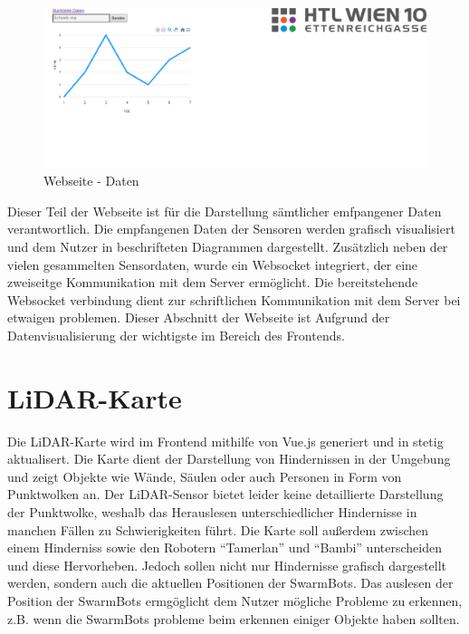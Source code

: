 \begin{figure}[H]
  \includegraphics[width=\textwidth, center]{img/Webseite_Daten.png}
  \caption{Webseite - Daten}
  \label{fig:Webseite_Daten}
\end{figure}

Dieser Teil der Webseite ist für die Darstellung sämtlicher emfpangener Daten verantwortlich.
Die empfangenen Daten der Sensoren werden grafisch visualisiert und dem Nutzer in beschrifteten Diagrammen dargestellt. 
%
Zusätzlich neben der vielen gesammelten Sensordaten, wurde ein Websocket integriert, 
der eine zweiseitge Kommunikation mit dem Server ermöglicht. 
%
Die bereitstehende Websocket verbindung dient zur schriftlichen Kommunikation mit dem Server bei etwaigen problemen.
%
Dieser Abschnitt der Webseite ist Aufgrund der Datenvisualisierung der wichtigste im Bereich des Frontends.

\section{LiDAR-Karte}
\label{subsec:frontend_lidar_map}
Die LiDAR-Karte wird im Frontend mithilfe von Vue.js generiert und in stetig aktualisert. 
Die Karte dient der Darstellung von Hindernissen in der Umgebung und zeigt Objekte wie Wände, 
Säulen oder auch Personen in Form von Punktwolken an. 
%
Der LiDAR-Sensor bietet leider keine detaillierte Darstellung der Punktwolke, 
weshalb das Herauslesen unterschiedlicher Hindernisse in manchen Fällen zu Schwierigkeiten führt. 
%
Die Karte soll außerdem zwischen einem Hinderniss sowie den Robotern ``Tamerlan'' und ``Bambi'' 
unterscheiden und diese Hervorheben. 
%
Jedoch sollen nicht nur Hindernisse grafisch dargestellt werden, 
sondern auch die aktuellen Positionen der SwarmBots.
%
Das auslesen der Position der SwarmBots ermgöglicht dem Nutzer mögliche Probleme zu erkennen, 
z.B. wenn die SwarmBots probleme beim erkennen einiger Objekte haben sollten.  

